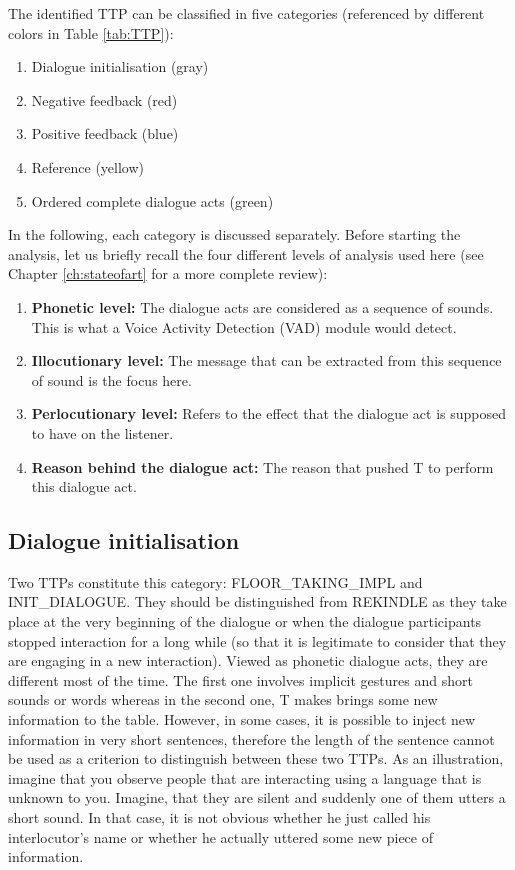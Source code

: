     The identified TTP can be classified in five categories (referenced by different colors in Table \ref{tab:TTP}):
    
    \begin{enumerate}
      \item Dialogue initialisation (gray)
      \item Negative feedback (red)
      \item Positive feedback (blue)
      \item Reference (yellow)
      \item Ordered complete dialogue acts (green)
    \end{enumerate}

    In the following, each category is discussed separately. Before starting the analysis, let us briefly recall the four different levels of analysis used here (see Chapter \ref{ch:stateofart} for a more complete review):
		
		\begin{enumerate}
			\item \textbf{Phonetic level:} The dialogue acts are considered as a sequence of sounds. This is what a Voice Activity Detection (VAD) module would detect.
			\item \textbf{Illocutionary level:} The message that can be extracted from this sequence of sound is the focus here.
			\item \textbf{Perlocutionary level:} Refers to the effect that the dialogue act is supposed to have on the listener.
			\item \textbf{Reason behind the dialogue act:} The reason that pushed T to perform this dialogue act.
		\end{enumerate}

    \subsection{Dialogue initialisation}
    \label{tax:dialinit}
		
         Two TTPs constitute this category: FLOOR\_TAKING\_IMPL and INIT\_DIALOGUE. They should be distinguished from REKINDLE as they take place at the very beginning of the dialogue or when the dialogue participants stopped interaction for a long while (so that it is legitimate to consider that they are engaging in a new interaction). Viewed as phonetic dialogue acts, they are different most of the time. The first one involves implicit gestures and short sounds or words whereas in the second one, T makes brings some new information to the table. However, in some cases, it is possible to inject new information in very short sentences, therefore the length of the sentence cannot be used as a criterion to distinguish between these two TTPs. As an illustration, imagine that you observe people that are interacting using a language that is unknown to you. Imagine, that they are silent and suddenly one of them utters a short sound. In that case, it is not obvious whether he just called his interlocutor's name or whether he actually uttered some new piece of information.
			
